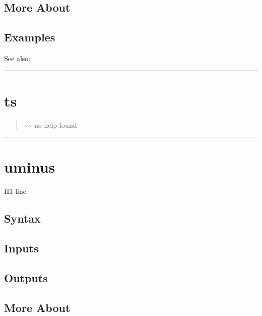 \documentclass[letterpaper,10pt,english]{sphinxmanual}
\begin{document}
\subsection{More About}
\label{classes/time_series/@ts/ts:id588}

\subsection{Examples}
\label{classes/time_series/@ts/ts:id589}
See also:


\bigskip\hrule{}\bigskip



\section{ts}
\label{classes/time_series/@ts/ts:ts}\label{classes/time_series/@ts/ts:id590}\begin{quote}

\textasciitilde{}\textasciitilde{} no help found
\end{quote}


\bigskip\hrule{}\bigskip



\section{uminus}
\label{classes/time_series/@ts/ts:uminus}\label{classes/time_series/@ts/ts:id591}
H1 line


\subsection{Syntax}
\label{classes/time_series/@ts/ts:id592}

\subsection{Inputs}
\label{classes/time_series/@ts/ts:id593}

\subsection{Outputs}
\label{classes/time_series/@ts/ts:id594}

\subsection{More About}
\label{classes/time_series/@ts/ts:id595}
\end{document}
